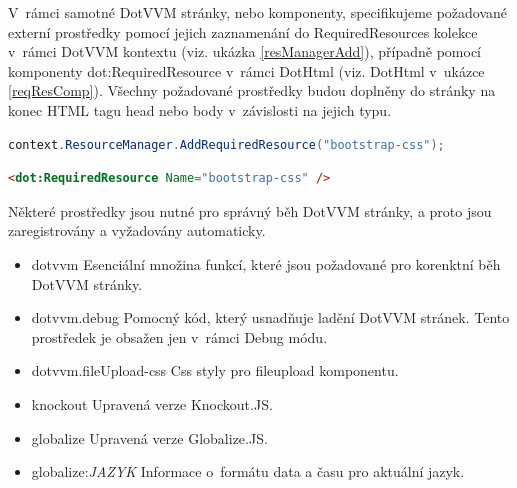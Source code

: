 V~rámci samotné DotVVM stránky, nebo komponenty, specifikujeme požadované externí prostředky pomocí jejich zaznamenání do RequiredResources kolekce v~rámci DotVVM kontextu (viz. ukázka \ref{resManagerAdd}), případně pomocí komponenty dot:RequiredResource v~rámci DotHtml (viz. DotHtml v~ukázce \ref{reqResComp}).
Všechny požadované prostředky budou doplněny do stránky na konec HTML tagu head nebo body v~závislosti na jejich typu.

\begin{lstlisting}[language=c#, caption=Specifikace požadovaného prostředku v~rámci C# kódu,label=resManagerAdd,captionpos=t]
context.ResourceManager.AddRequiredResource("bootstrap-css");

\end{lstlisting}

\begin{lstlisting}[language=Html, caption=Specifikace požadovaného prostředku v~rámci DotHtml,label=reqResComp,captionpos=t]
<dot:RequiredResource Name="bootstrap-css" />

\end{lstlisting}
\pagebreak
Některé prostředky jsou nutné pro správný běh DotVVM stránky, a proto jsou zaregistrovány a vyžadovány automaticky.

\begin{itemize}
  \setlength\itemsep{0.2em}
    \item dotvvm\newline
    Esenciální množina funkcí, které jsou požadované pro korenktní běh DotVVM stránky.
    \item dotvvm.debug\newline
    Pomocný kód, který usnadňuje ladění DotVVM stránek. Tento prostředek je obsažen jen v~rámci Debug módu.
    \item dotvvm.fileUpload-css\newline
    Css styly pro fileupload komponentu.
    \item knockout\newline
    Upravená verze Knockout.JS.
    \item globalize\newline
    Upravená verze Globalize.JS.
    \item globalize:\textit{JAZYK}
    Informace o~formátu data a času pro aktuální jazyk.
\end{itemize}
